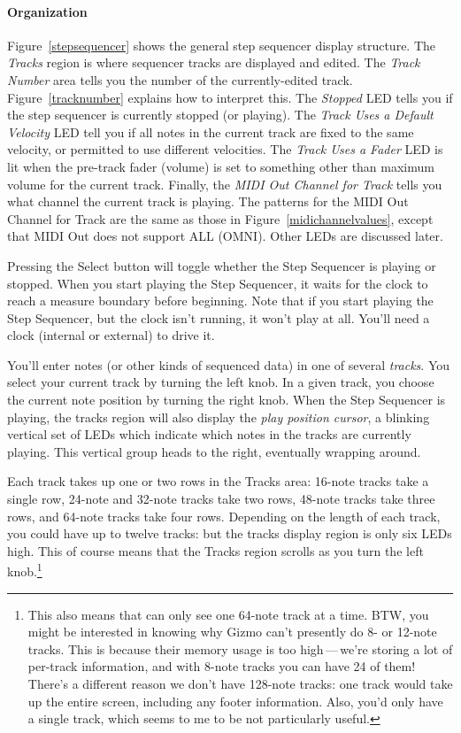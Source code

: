 \documentclass{article}
\begin{document}
\paragraph{Organization} Figure~\ref{stepsequencer} shows the general step sequencer display structure.  The {\it Tracks} region is where sequencer tracks are displayed and edited.  The {\it Track Number} area tells you the number of the currently-edited track.  Figure~\ref{tracknumber} explains how to interpret this.  The {\it Stopped} LED tells you if the step sequencer is currently stopped (or playing).  The {\it Track Uses a Default Velocity} LED tell you if all notes in the current track are fixed to the same velocity, or permitted to use different velocities.  The {\it Track Uses a Fader} LED is lit when the pre-track fader (volume) is set to something other than maximum volume for the current track.   Finally, the {\it MIDI Out Channel for Track} tells you what channel the current track is playing.  The patterns for the MIDI Out Channel for Track are the same as those in Figure~\ref{midichannelvalues}, except that MIDI Out does not support ALL (OMNI).  Other LEDs are discussed later.

Pressing the Select button will toggle whether the Step Sequencer is playing or stopped.  When you start playing the Step Sequencer, it waits for the clock to reach a measure boundary before beginning.  Note that if you start playing the Step Sequencer, but the clock isn't running, it won't play at all.  You'll need a clock (internal or external) to drive it.

You'll enter notes (or other kinds of sequenced data) in one of several {\it tracks}. You select your current track by turning the left knob.  In a given track, you choose the current note position by turning the right knob.  When the Step Sequencer is playing, the  tracks region will also display the {\it play position cursor}, a blinking vertical set of LEDs which indicate which notes in the tracks are currently playing.  This vertical group heads to the right, eventually wrapping around. 

Each track takes up one or two rows in the Tracks area: 16-note tracks take a single row, 24-note and 32-note tracks take two rows, 48-note tracks take three rows, and 64-note tracks take four rows.    Depending on the length of each track, you could have  up to twelve tracks: but the tracks display region is only six LEDs high.  This of course means that  the Tracks region scrolls as you turn the left knob.\footnote{This also means that can only see one 64-note track at a time.  BTW, you might be interested in knowing why Gizmo can't presently do 8- or 12-note tracks.  This is because their memory usage is too high\,---\,we're storing a lot of per-track information, and with 8-note tracks you can have 24 of them!  There's a different reason we don't have 128-note tracks: one track would take up the entire screen, including any footer information.  Also, you'd only have a single track, which seems to me to be not particularly useful.}
\end{document}
